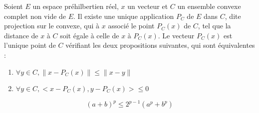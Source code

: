 \documentclass[landscape,twocolumn]{article}
\begin{document}
\begin{ine}
\begin{center}
Soient $E$ un espace préhilbertien réel, $x$ un vecteur et $C$ un ensemble convexe complet non vide de $E$.
Il existe une unique application $P_C$ de $E$ dans $C$, dite projection sur le convexe, qui à $x$ associé le point $P_C(x)$ de $C$, tel que la distance de $x$ à $C$ soit égale à celle de $x$ à $P_C(x)$. Le vecteur $P_C(x)$ est l'unique point de $C$ vérifiant les deux propositions suivantes, qui sont équivalentes : 
\begin{enumerate}
\item $\forall y \in C, \parallel x - P_C(x) \parallel \leq \parallel x - y \parallel$ \\
\item $\forall y \in C, <x-P_C(x), y-P_C(x) > \leq 0$
\end{enumerate}
\end{center}
\end{ine}

\begin{ine}[]
$$(a+b)^p \leq 2^{p-1} (a^p+b^p)$$
\end{ine}
\end{document}
